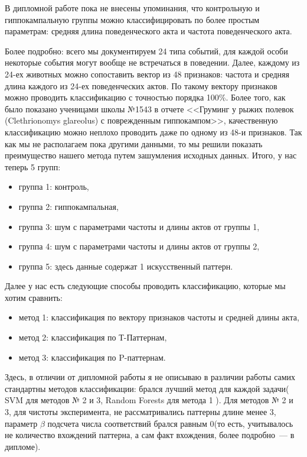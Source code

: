 \documentclass[12pt]{report}
\author{Вишневский~Валерий~Викторович}
\begin{document}
\newcommand{\Var}{\mathsf{var}}
\newcommand{\Erf}{\mathsf{erf}}

В дипломной работе пока  не внесены упоминания, что контрольную и гиппокампальную 
группы можно классифицировать по более простым параметрам: средняя длина поведенческого акта
и частота поведенческого акта.

Более подробно: всего мы документируем 24 типа событий, для каждой особи некоторые события могут вообще не встречаться в поведении.
Далее, каждому из 24-ех животных можно сопоставить вектор из 48 признаков: частота и средняя длина каждого из 24-ех поведенческих актов.
По такому вектору признаков можно проводить классификацию с точностью порядка 100\%. Более того, как было показано ученицами школы №1543 в отчете 
<<Груминг у рыжих полевок (Clethrionomys glareolus) с поврежденным гиппокампом>>, качественную классификацию можно неплохо проводить даже по одному из
48-и признаков. Так как мы не располагаем пока другими данными, то мы решили показать преимущество нашего метода путем зашумления исходных данных. 
Итого, у нас теперь 5 групп:
\begin{itemize}
 \item группа 1: контроль,
\item группа 2: гиппокампальная,
\item группа 3: шум с параметрами частоты и длины актов от группы 1,
\item группа 4: шум с параметрами частоты и длины актов от группы 2,
\item группа 5: здесь данные содержат 1 искусственный паттерн.
\end{itemize}
Далее у нас есть следующие способы проводить классификацию, которые мы хотим сравнить:
\begin{itemize}
\item метод 1: классификация по вектору признаков частоты и средней длины акта,
\item метод 2: классификация по Т-Паттернам,
\item метод 3: классификация по P-паттернам.
\end{itemize}

Здесь, в отличии от дипломной работы я не описываю в различии работы самих стандартны методов 
классификации: брался лучший метод для каждой задачи( SVM для методов № 2 и 3, Random Forests для метода 1 ). 
Для методов № 2 и 3, для чистоты эксперимента, не рассматривались паттерны длине менее 3, параметр $\beta$ 
подсчета числа соответствий брался равным 0(то есть, учитывалось не количество вхождений
паттерна, а сам факт вхождения, более подробно~--- в дипломе). 
\end{document}
